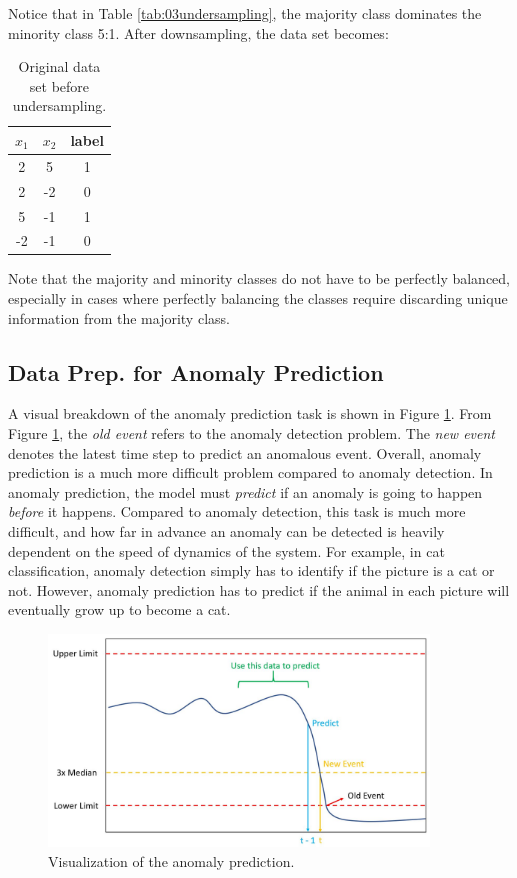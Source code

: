 Notice that in Table \ref{tab:03undersampling}, the majority class dominates the minority class 5:1.  After downsampling, the data set becomes:

\begin{table}[H]
    \centering
    \begin{tabular}{ c | c | c }
        $x_1$ & $x_2$ & label \\
        \hline
        2 & 5 & 1 \\
        2 & -2 & 0 \\
        5 & -1 & 1 \\
        -2 & -1 & 0 \\
    \end{tabular}
    \caption{Original data set before undersampling.}
    \label{tab:03undersampling2}
\end{table}
Note that the majority and minority classes do not have to be perfectly balanced, especially in cases where perfectly balancing the classes require discarding unique information from the majority class.

\subsection{Data Prep. for Anomaly Prediction}
A visual breakdown of the anomaly prediction task is shown in Figure \ref{fig:03anomaly_pred}. From Figure \ref{fig:03anomaly_pred}, the \textit{old event} refers to the anomaly detection problem. The \textit{new event} denotes the latest time step to predict an anomalous event. Overall, anomaly prediction is a much more difficult problem compared to anomaly detection.  In anomaly prediction, the model must \textit{predict} if an anomaly is going to happen \textit{before} it happens.  Compared to anomaly detection, this task is much more difficult, and how far in advance an anomaly can be detected is heavily dependent on the speed of dynamics of the system.  For example, in cat classification, anomaly detection simply has to identify if the picture is a cat or not.  However, anomaly prediction has to predict if the animal in each picture will eventually grow up to become a cat.

\begin{figure}[H]
    \centering
    \includegraphics[width=0.9\textwidth]{images/ch3/anomaly_prediction.JPG}
    \caption{Visualization of the anomaly prediction.}
    \label{fig:03anomaly_pred}
\end{figure}

